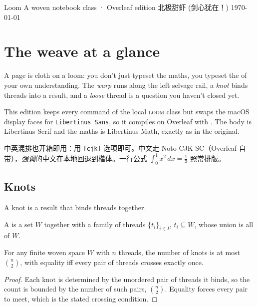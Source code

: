 \documentclass[cjk]{loom}
\begin{document}
\loomcover
  {Loom}
  {A woven notebook class · Overleaf edition}
  {北极甜虾 (剑心犹在！)}
  {\today}

{\small\tableofcontents}
\clearpage

\section{The weave at a glance}

\begin{strand}
A page is cloth on a loom: you don't just typeset the maths, you typeset the
 of your own understanding. The \emph{warp} runs along the left
selvage rail, a \emph{knot} binds threads into a result, and a \emph{loose}
thread is a question you haven't closed yet.
\end{strand}

This edition keeps every command of the local \textsc{loom} class but swaps the
macOS display faces for \texttt{Libertinus Sans}, so it compiles on Overleaf
with . The body is Libertinus Serif and the maths is
Libertinus Math, exactly as in the original.

\begin{strand}
中英混排也开箱即用：用 \texttt{[cjk]} 选项即可。中文走 Noto CJK SC（Overleaf
自带），\emph{强调}的中文在本地回退到楷体。一行公式 $\int_0^1 x^2\,dx = \tfrac13$
照常排版。
\end{strand}

\subsection{Knots} A knot is a result that binds threads together.

\begin{definition}
A  is a set $W$ together with a family of threads
$\{t_i\}_{i\in I}$, $t_i \subseteq W$, whose union is all of $W$.
\end{definition}

\begin{theorem}
For any finite woven space $W$ with $n$ threads, the number of knots is at most
$\binom{n}{2}$, with equality iff every pair of threads crosses exactly once.
\end{theorem}

\begin{proof}
Each knot is determined by the unordered pair of threads it binds, so the count
is bounded by the number of such pairs, $\binom{n}{2}$. Equality forces every
pair to meet, which is the stated crossing condition.
\end{proof}
\end{document}
